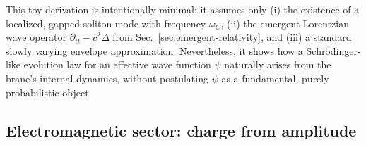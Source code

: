 This toy derivation is intentionally minimal: it assumes only (i) the
existence of a localized, gapped soliton mode with frequency
$\omega_C$, (ii) the emergent Lorentzian wave operator
$\partial_{tt} - c^2\Delta$ from Sec.~\ref{sec:emergent-relativity}, and
(iii) a standard slowly varying envelope approximation. Nevertheless, it
shows how a Schrödinger-like evolution law for an effective wave
function $\psi$ naturally arises from the brane's internal dynamics,
without postulating $\psi$ as a fundamental, purely probabilistic
object.

\subsection{Electromagnetic sector: charge from amplitude}
\label{sec:charge-amplitude}


